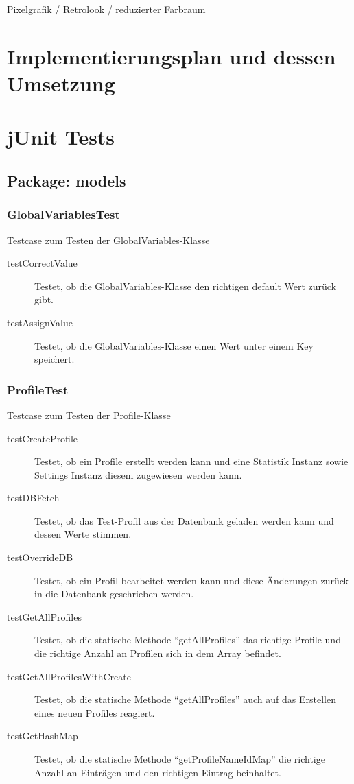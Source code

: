 \documentclass[parskip=full]{scrreprt}
\begin{document}
\begin{description}
	\item Pixelgrafik / Retrolook / reduzierter Farbraum
\end{description}

\chapter{Implementierungsplan und dessen Umsetzung}

\chapter{jUnit Tests}

\section{Package: models}

\subsection{GlobalVariablesTest}

Testcase zum Testen der GlobalVariables-Klasse

\begin{description}
\item[testCorrectValue]
	Testet, ob die GlobalVariables-Klasse den richtigen default Wert zurück gibt.
\item[testAssignValue]
	Testet, ob die GlobalVariables-Klasse einen Wert unter einem Key speichert.
\end{description}

\subsection{ProfileTest}

Testcase zum Testen der Profile-Klasse

\begin{description}
	\item[testCreateProfile] Testet, ob ein Profile erstellt werden kann und eine Statistik Instanz sowie Settings Instanz diesem zugewiesen werden kann.
	\item[testDBFetch] Testet, ob das Test-Profil aus der Datenbank geladen werden kann und dessen Werte stimmen.
	\item[testOverrideDB] Testet, ob ein Profil bearbeitet werden kann und diese Änderungen zurück in die Datenbank geschrieben werden.
	\item[testGetAllProfiles] Testet, ob die statische Methode \enquote{getAllProfiles} das richtige Profile und die richtige Anzahl an Profilen sich in dem Array befindet.
	\item[testGetAllProfilesWithCreate] Testet, ob die statische Methode \enquote{getAllProfiles} auch auf das Erstellen eines neuen Profiles reagiert.
	\item[testGetHashMap] Testet, ob die statische Methode \enquote{getProfileNameIdMap} die richtige Anzahl an Einträgen und den richtigen Eintrag beinhaltet.
\end{description}
\end{document}
